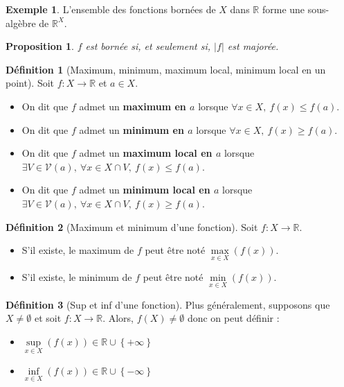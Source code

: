 \documentclass[french]{book}
\newcommand{\R}{\mathbb{R}}
\theoremstyle{plain}
\newtheorem{prop}{Proposition}[chapter]
\theoremstyle{definition}
\newtheorem{dfn}{Définition}[chapter]
\newtheorem{exa}{Exemple}[chapter]
\theoremstyle{remark}
\begin{document}
\begin{exa}
	L'ensemble des fonctions bornées de $X$ dans $\R$ forme une sous-algèbre de $\R^X$.
\end{exa}
\begin{prop}
	$f$ est bornée si, et seulement si, $\lvert f\rvert$ est majorée.
\end{prop}
\begin{dfn}[Maximum, minimum, maximum local, minimum local en un point]
	Soit $f:X\rightarrow\R$ et $a\in X$. 
	\begin{itemize}
		\item On dit que $f$ admet un \textbf{maximum en $a$} lorsque $\forall x\in X,\ f(x)\leqslant f(a)$.
		\item On dit que $f$ admet un \textbf{minimum en $a$} lorsque $\forall x\in X,\ f(x)\geqslant f(a)$.
		\item On dit que $f$ admet un \textbf{maximum local en $a$} lorsque $\exists V\in\mathcal{V}(a),\ \forall x\in X\cap V,\ f(x)\leqslant f(a)$.
		\item On dit que $f$ admet un \textbf{minimum local en $a$} lorsque $\exists V\in\mathcal{V}(a),\ \forall x\in X\cap V,\ f(x)\geqslant f(a)$.
	\end{itemize}
\end{dfn}
\begin{dfn}[Maximum et minimum d'une fonction]
	Soit $f:X\rightarrow\R$.
	\begin{itemize}
		\item S'il existe, le maximum de $f$ peut être noté $\underset{x\in X}{\max}(f(x))$.
		\item S'il existe, le minimum de $f$ peut être noté $\underset{x\in X}{\min}(f(x))$.
	\end{itemize}
\end{dfn}
\begin{dfn}[Sup et inf d'une fonction]
	Plus généralement, supposons que $X\ne\emptyset$ et soit $f:X\rightarrow\R$. Alors, $f(X)\ne\emptyset$ donc on peut définir :
	\begin{itemize}
		\item $\underset{x\in X}{\sup}(f(x))\in\R\cup\left\{+\infty\right\}$
		\item $\underset{x\in X}{\inf}(f(x))\in\R\cup\left\{-\infty\right\}$
	\end{itemize}
\end{dfn}
\end{document}
